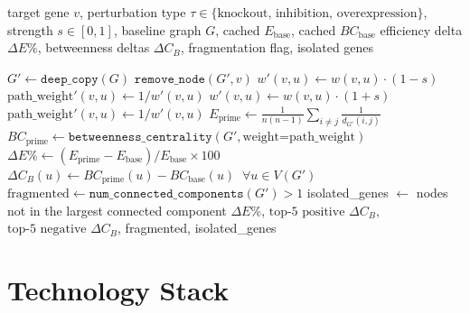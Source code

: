 \documentclass[12pt,a4paper]{report}
\begin{document}
\begin{algorithm}[H]
\caption{Single-Gene Perturbation Engine}
\label{alg:perturb}
\begin{algorithmic}[1]
\Require target gene $v$, perturbation type $\tau \in \{\text{knockout, inhibition, overexpression}\}$, strength $s \in [0,1]$, baseline graph $G$, cached $E_{\text{base}}$, cached $\mathit{BC}_{\text{base}}$
\Ensure efficiency delta $\Delta E\%$, betweenness deltas $\Delta C_B$, fragmentation flag, isolated genes

\State $G' \leftarrow \texttt{deep\_copy}(G)$
  \State $\texttt{remove\_node}(G', v)$
    \State $w'(v,u) \leftarrow w(v,u) \cdot (1 - s)$
    \State $\text{path\_weight}'(v,u) \leftarrow 1 / w'(v,u)$
  \EndFor
{}
    \State $w'(v,u) \leftarrow w(v,u) \cdot (1 + s)$
    \State $\text{path\_weight}'(v,u) \leftarrow 1 / w'(v,u)$
  \EndFor
\EndIf
\State $E_{\text{prime}} \leftarrow \frac{1}{n(n-1)} \sum_{i \neq j} \frac{1}{d_{G'}(i,j)}$ 
\State $\mathit{BC}_{\text{prime}} \leftarrow \texttt{betweenness\_centrality}(G', \text{weight=path\_weight})$
\State $\Delta E\% \leftarrow (E_{\text{prime}} - E_{\text{base}}) / E_{\text{base}} \times 100$
\State $\Delta C_B(u) \leftarrow \mathit{BC}_{\text{prime}}(u) - \mathit{BC}_{\text{base}}(u) \;\;\forall u \in V(G')$
\State $\text{fragmented} \leftarrow \texttt{num\_connected\_components}(G') > 1$
  \State isolated\_genes $\leftarrow$ nodes not in the largest connected component
\EndIf
\State \Return $\Delta E\%$, $\text{top-5 positive } \Delta C_B$, $\text{top-5 negative } \Delta C_B$, fragmented, isolated\_genes
\end{algorithmic}
\end{algorithm}

\chapter{Technology Stack}
\end{document}
